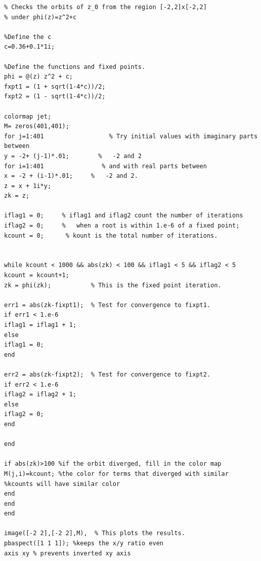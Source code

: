 \documentclass[12pt]{article}
\begin{document}
\begin{verbatim}
% Checks the orbits of z_0 from the region [-2,2]x[-2,2]
% under phi(z)=z^2+c

%Define the c
c=0.36+0.1*1i;

%Define the functions and fixed points.
phi = @(z) z^2 + c;
fxpt1 = (1 + sqrt(1-4*c))/2;
fxpt2 = (1 - sqrt(1-4*c))/2;

colormap jet;
M= zeros(401,401);
for j=1:401                  % Try initial values with imaginary parts between
y = -2+ (j-1)*.01;        %   -2 and 2
for i=1:401                % and with real parts between
x = -2 + (i-1)*.01;     %   -2 and 2.
z = x + 1i*y;
zk = z;

iflag1 = 0;     % iflag1 and iflag2 count the number of iterations
iflag2 = 0;     %   when a root is within 1.e-6 of a fixed point;
kcount = 0;      % kount is the total number of iterations.


while kcount < 1000 && abs(zk) < 100 && iflag1 < 5 && iflag2 < 5
kcount = kcount+1;
zk = phi(zk);           % This is the fixed point iteration.

err1 = abs(zk-fixpt1);  % Test for convergence to fixpt1.
if err1 < 1.e-6
iflag1 = iflag1 + 1;
else
iflag1 = 0;
end

err2 = abs(zk-fixpt2);  % Test for convergence to fixpt2.
if err2 < 1.e-6
iflag2 = iflag2 + 1;
else
iflag2 = 0;
end

end

if abs(zk)>100 %if the orbit diverged, fill in the color map
M(j,i)=kcount; %the color for terms that diverged with similar
%kcounts will have similar color
end
end
end

image([-2 2],[-2 2],M),  % This plots the results.
pbaspect([1 1 1]); %keeps the x/y ratio even
axis xy % prevents inverted xy axis
\end{verbatim}
\end{document}
